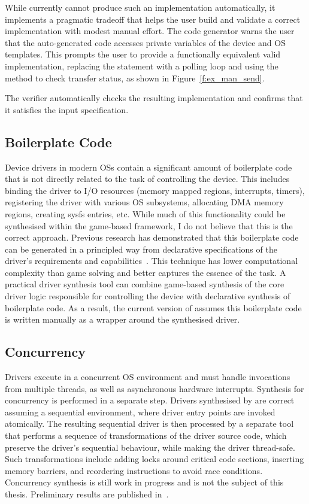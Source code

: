 While \termite currently cannot produce such an implementation automatically, it implements a pragmatic tradeoff that helps the user build and validate a correct implementation with modest manual effort.  The code generator warns the user that the auto-generated code accesses private variables of the device and OS templates.  This prompts the user to provide a functionally equivalent valid implementation, replacing the  statement with a polling loop and using the  method to check transfer status, as shown in Figure~\ref{f:ex_man_send}.

The verifier automatically checks the resulting implementation and confirms that it satisfies the input specification.

\subsection{Boilerplate Code}

Device drivers in modern OSs contain a significant amount of boilerplate code that is not directly related to the task of controlling the device.  This includes binding the driver to I/O resources (memory mapped regions, interrupts, timers), registering the driver with various OS subsystems, allocating DMA memory regions, creating sysfs entries, etc.  While much of this functionality could be synthesised within the game-based framework, I do not believe that this is the correct approach.  Previous research has demonstrated that this boilerplate code can be generated in a principled way from declarative specifications of the driver's requirements and capabilities~\cite{Spear_RHHL_06}.  This technique has lower computational complexity than game solving and better captures the essence of the task.  A practical driver synthesis tool can combine game-based synthesis of the core driver logic responsible for controlling the device with declarative synthesis of boilerplate code.  As a result, the current version of \termite assumes this boilerplate code is written manually as a wrapper around the synthesised driver.

\subsection{Concurrency}

Drivers execute in a concurrent OS environment and must handle invocations from multiple threads, as well as asynchronous hardware interrupts.  Synthesis for concurrency is performed in a separate step.  Drivers synthesised by \termite are correct assuming a sequential environment, where driver entry points are invoked atomically.  The resulting sequential driver is then processed by a separate tool that performs a sequence of transformations of the driver source code, which preserve the driver's sequential behaviour, while making the driver thread-safe.  Such transformations include adding locks around critical code sections, inserting memory barriers, and reordering instructions to avoid race conditions.  Concurrency synthesis is still work in progress and is not the subject of this thesis.  Preliminary results are published in~\cite{Cerny_HRRT_13, Cerny_HRRT_14, scheduling-cav15}.

